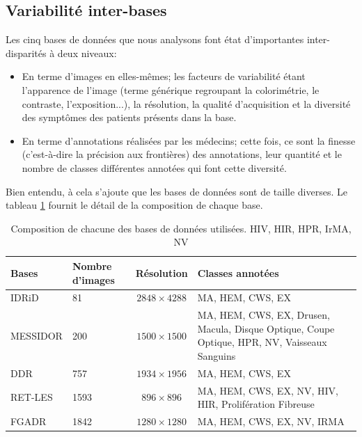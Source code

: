 \subsection{Variabilité inter-bases}
\label{sec:variabilitéSegmentation}
Les cinq bases de données que nous analysons font état d'importantes inter-disparités à deux niveaux:
\begin{itemize}
	\item En terme d'images en elles-mêmes; les facteurs de variabilité étant l'apparence de l'image (terme générique regroupant la colorimétrie, le contraste, l'exposition...), la résolution, la qualité d'acquisition et la diversité des symptômes des patients présents dans la base.
	\item En terme d'annotations réalisées par les médecins; cette fois, ce sont la finesse (c'est-à-dire la précision aux frontières) des annotations,  leur quantité et le nombre de classes différentes annotées qui font cette diversité.
\end{itemize}
Bien entendu, à cela s'ajoute que les bases de données sont de taille diverses. Le tableau \ref{tab:databasesCaracteristics} fournit le détail de la composition de chaque base.
\begin{table}
	\centering
	\caption{Composition de chacune des bases de données utilisées. \acf{HIV}, \acf{HIR}, \acf{HPR}, \acf{IrMA}, \acf{NV}}
	\begin{tabularx}{\linewidth}{llcX}
		\toprule
		Bases & Nombre d'images & Résolution & Classes annotées \\
		\midrule
		\ac{IDRiD} & 81 & $2848 \times 4288$ & \ac{MA}, \ac{HEM}, \ac{CWS}, \ac{EX}\\
		MESSIDOR & 200 & $1500\times 1500$ & \ac{MA}, \ac{HEM}, \ac{CWS}, \ac{EX}, Drusen, Macula, Disque Optique, Coupe Optique, \ac{HPR}, \ac{NV}, Vaisseaux Sanguins\\		
		\ac{DDR} & 757 & $1934 \times 1956$ & \ac{MA}, \ac{HEM}, \ac{CWS}, \ac{EX}\\
		RET-LES & 1593 & $896 \times 896$ & \ac{MA}, \ac{HEM}, \ac{CWS}, \ac{EX}, \ac{NV}, \ac{HIV}, \ac{HIR}, Prolifération Fibreuse\\
		\ac{FGADR} & 1842 & $1280 \times 1280$ & \ac{MA}, \ac{HEM}, \ac{CWS}, \ac{EX}, NV, IRMA\\		
		\bottomrule
	\end{tabularx}

\label{tab:databasesCaracteristics}
\end{table}

